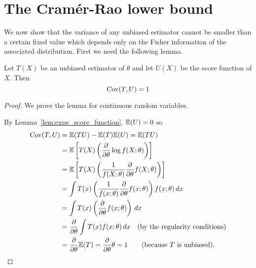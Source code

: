 
\section{The Cram\'{e}r-Rao lower bound}\label{sec:crlb}

We now show that the variance of any unbiased estimator cannot be smaller than a certain fixed value which depends only on the Fisher information of the associated distribution. First we need the following lemma.
%
\begin{lemma}
Let $T(X)$ be an unbiased estimator of $\theta$ and let $U(X)$ be the score function of $X$. Then
\[
\text{Cov}(T,U) = 1
\]
\end{lemma}

\begin{proof}
We prove the lemma for continuous random variables. 
\par
By Lemma~\ref{lem:expe_score_function}, $\mathbb{E}(U)=0$ so
\begin{align*}
\text{Cov}(T,U)
	& = \mathbb{E}(TU) - \mathbb{E}(T)\mathbb{E}(U) = \mathbb{E}(TU) \\
	& = \mathbb{E}\left[T(X)\left(\frac{\partial}{\partial\theta}\log f(X;\theta)\right)\right] \\
	& = \mathbb{E}\left[T(X)\left(\frac{1}{f(X;\theta)}\frac{\partial}{\partial\theta}f(X;\theta)\right)\right] \\
	& = \int T(x)\left(\frac{1}{f(x;\theta)}\frac{\partial}{\partial\theta}f(x;\theta)\right)f(x;\theta)\,dx \\
	& = \int T(x)\left(\frac{\partial}{\partial\theta}f(x;\theta)\right)\,dx\\
	& = \frac{\partial}{\partial\theta}\int T(x)f(x;\theta)\,dx \quad\text{(by the regularity conditions)} \\
	& = \frac{\partial}{\partial\theta}\mathbb{E}(T)
	= \frac{\partial}{\partial\theta}\theta
	= 1\qquad\text{(because $T$ is unbiased).}
\end{align*}
\end{proof}

